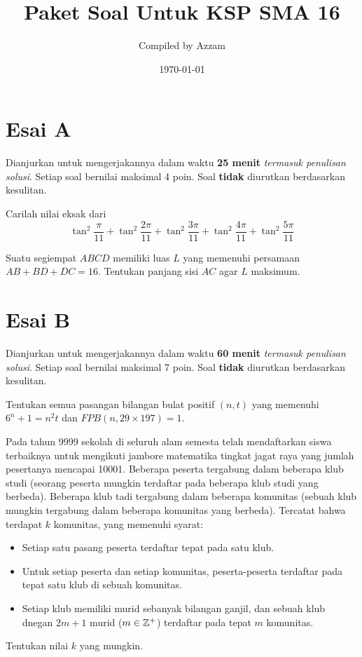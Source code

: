 \documentclass[11pt]{scrartcl}
\begin{document}
	\title{Paket Soal Untuk KSP SMA 16} %
	\date{\today}
	\author{Compiled by Azzam}
	\maketitle
	

	\section{Esai A}
	Dianjurkan untuk mengerjakannya dalam waktu \textbf{25 menit} \textit{termasuk penulisan solusi}. Setiap soal bernilai maksimal 4 poin. Soal \textbf{tidak} diurutkan berdasarkan kesulitan. 
	
	\begin{soalbaru}
	Carilah nilai eksak dari $$\tan^2 \frac{\pi}{11}+\tan^2 \frac{2\pi}{11}+\tan^2 \frac{3\pi}{11}+\tan^2 \frac{4\pi}{11}+\tan^2 \frac{5\pi}{11}$$
	\end{soalbaru}
	
	\begin{soalbaru}
	Suatu segiempat $ABCD$ memiliki luas $L$ yang memenuhi persamaan $AB+BD+DC=16$. Tentukan panjang sisi $AC$ agar $L$ maksimum.
	\end{soalbaru}
	
	\section{Esai B}
	Dianjurkan untuk mengerjakannya dalam waktu \textbf{60 menit} \textit{termasuk penulisan solusi}. Setiap soal bernilai maksimal 7 poin. Soal \textbf{tidak} diurutkan berdasarkan kesulitan.
	
	\begin{soalbaru}
		Tentukan semua pasangan bilangan bulat positif $(n,t)$ yang memenuhi $6^n+1=n^2t$ dan $FPB(n, 29\times 197)=1$.
	\end{soalbaru} 
	
	\begin{soalbaru}
	Pada tahun 9999 sekolah di seluruh alam semesta telah mendaftarkan siswa terbaiknya untuk mengikuti jambore matematika tingkat jagat raya yang jumlah pesertanya mencapai 10001. Beberapa peserta tergabung dalam beberapa klub studi (seorang peserta mungkin terdaftar pada beberapa klub studi yang berbeda). Beberapa klub tadi tergabung dalam beberapa komunitas (sebuah klub mungkin tergabung dalam beberapa komunitas yang berbeda). Tercatat bahwa terdapat $k$ komunitas, yang memenuhi syarat:
	\begin{itemize}
	\item Setiap satu pasang peserta terdaftar tepat pada satu klub.
	\item Untuk setiap peserta dan setiap komunitas, peserta-peserta terdaftar pada tepat satu klub di sebuah komunitas.
	\item Setiap klub memiliki murid sebanyak bilangan ganjil, dan sebuah klub dnegan $2m+1$ murid ($m \in \mathbb Z^+$) terdaftar pada tepat $m$ komunitas.
	\end{itemize}
	Tentukan nilai $k$ yang mungkin.
	
	
	\end{soalbaru}
	
\end{document}
